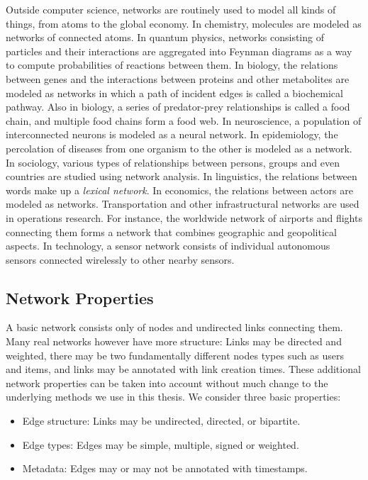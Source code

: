 \documentclass[11pt,a4paper]{book}
\begin{document}
Outside computer science, networks are routinely used to model all kinds
of things, from atoms to the global economy.  
In chemistry, molecules are modeled as networks of connected atoms.  
In quantum physics, networks consisting of particles and their
interactions are aggregated into Feynman diagrams as a way to
compute probabilities of reactions between them. 
In biology, the relations between genes and the interactions between
proteins and other metabolites are modeled as networks 
in which a path of incident edges is called a biochemical pathway.
Also in biology, a series of predator-prey relationships is called a
food chain, and multiple food chains form a food web. 
In neuroscience, a population of interconnected neurons is modeled as a
neural network.  
In epidemiology, the percolation of diseases from one organism to the
other is modeled as a network.  
In sociology, various types of relationships between persons, groups and
even countries are studied using network analysis. 
In linguistics, the relations between words make up a \emph{lexical
  network}.
In economics, the relations between actors are modeled as networks. 
Transportation and other infrastructural networks are used in operations
research. 
For instance, the worldwide network of airports and flights connecting
them forms a network that combines geographic and geopolitical aspects. 
In technology, a sensor network consists of individual autonomous
sensors connected wirelessly to other nearby sensors.  

\subsection{Network Properties}
A basic network consists only of nodes and undirected links connecting
them.  Many real networks however have more structure:  Links may be
directed and weighted, there may be two fundamentally different nodes
types such as users and items, and links may be annotated with link
creation times.  These additional network properties can be taken into
account without much change to the underlying methods we use in this
thesis.  We consider three basic properties:
\begin{itemize}
\item Edge structure:  Links may be undirected, directed, or bipartite. 
\item Edge types:  Edges may be simple, multiple, signed or weighted.
\item Metadata:  Edges may or may not be annotated with timestamps. 
\end{itemize}
\end{document}
